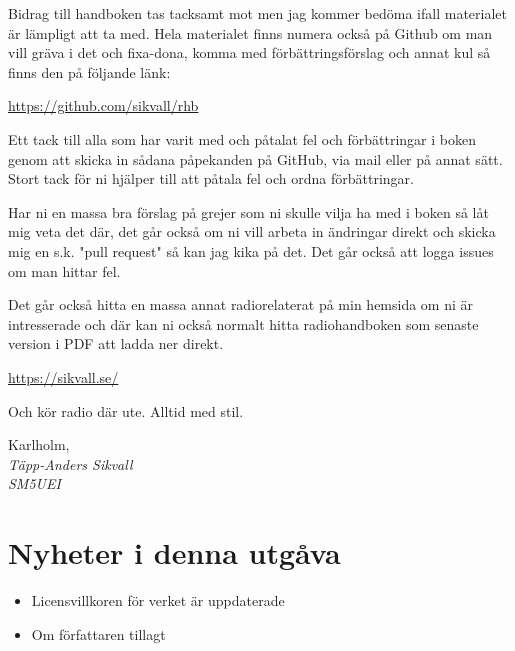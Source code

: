 Bidrag till handboken tas tacksamt mot men jag kommer bedöma ifall materialet
är lämpligt att ta med.  Hela materialet finns numera också på Github om man
vill gräva i det och fixa-dona, komma med förbättrings\-förslag och annat kul
så finns den på följande länk:

\href{https://github.com/sikvall/rhb/}{https://github.com/sikvall/rhb}

Ett tack till alla som har varit med och påtalat fel och förbättringar i boken
genom att skicka in sådana påpekanden på GitHub, via mail eller på annat sätt.
Stort tack för ni hjälper till att påtala fel och ordna förbättringar.

Har ni en massa bra förslag på grejer som ni skulle vilja ha med i boken så låt
mig veta det där, det går också om ni vill arbeta in ändringar direkt och skicka
mig en s.k. "pull request" så kan jag kika på det. Det går också att logga
issues om man hittar fel.

Det går också hitta en massa annat radiorelaterat på min hemsida om ni är
intresserade och där kan ni också normalt hitta radiohandboken som senaste
version i PDF att ladda ner direkt.

\href{https://sikvall.se}{https://sikvall.se/}

Och kör radio där ute. Alltid med stil.

\vspace{4mm}

Karlholm, \DokumentDatum\\
\textit{Täpp-Anders Sikvall\\
	SM5UEI}

\clearpage

\section*{Nyheter i denna utgåva}

\begin{itemize}
  \item Licensvillkoren för verket är uppdaterade
  \item Om författaren tillagt
\end{itemize}





\clearpage


